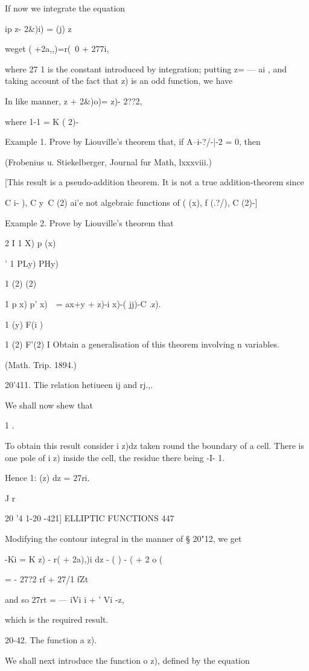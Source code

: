 {If now we integrate the equation

ip z- 2\&)i) = (j) z\

weget ( +2a,,)=r(~0 + 277i,

where 27 1 is the constant introduced by integration; putting z= — ai
, and taking account of the fact that z) is an odd function, we have

In like manner, z + 2\&)o)= z)- 2??2,

where 1-1 = K ( 2)-

Example 1. Prove by Liouville's theorem that, if A--i-?/-|-2 = 0, then

(Frobenius u. Stiekelberger, Journal fur Math, lxxxviii.)

[This result is a pseudo-addition theorem. It is not a true
addition-theorem since

C i- ), C y\ C (2) ai'e not algebraic functions of ( (x), f (.?/), C
(2)-]

Example 2. Prove by Liouville's theorem that

2 I 1 X) p (x)

' 1 PLy) PHy)

1 (2) (2)

1 p x) p' x)\ \ = ax+y + z)-i x)-( jj)-C .z).

1 (y) F(i )

1 (2) F'(2) I Obtain a generalisation of this theorem involving n
variables.

(Math. Trip. 1894.)

20'411. Tlie relation hetiueen ij and rj.,.

We shall now shew that

1 .

To obtain this result consider i z)dz taken round the boundary of a
cell. There is one pole of i z) inside the cell, the residue there
being -I- 1.

Hence 1: (z) dz = 27ri.

J r

20 '4 1-20 -421] ELLIPTIC FUNCTIONS 447

Modifying the contour integral in the manner of § 20"12, we get

 -Ki = K z) - r( + 2a),)i dz - ( ) - ( + 2 o (

= - 27?2 rf + 27/1 fZt

and so 27rt = — iVi i + ' Vi -z,

which is the required result.

20-42. The function a z).

We shall next introduce the function o z), defined by the equation

}
